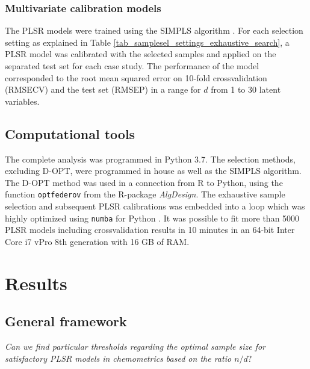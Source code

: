 \documentclass[journal=ancham,manuscript=article]{achemso}
\begin{document}
\subsubsection{Multivariate calibration models}

The PLSR models were trained using the SIMPLS algorithm \cite{DeJong1993}. For each selection setting as explained in Table \ref{tab_samplesel_settings_exhaustive_search}, a PLSR model was calibrated with the selected samples and applied on the separated test set for each case study. The performance of the model corresponded to the root mean squared error on 10-fold crossvalidation (RMSECV) and the test set (RMSEP) in a range for $d$ from 1 to 30 latent variables. 

\subsection{Computational tools}

The complete analysis was programmed in Python 3.7. The selection methods, excluding D-OPT, were programmed in house as well as the SIMPLS algorithm. The D-OPT method was used in a connection from R to Python, using the function \texttt{optfederov} from the R-package \emph{AlgDesign}\cite{Wheeler2019}. The exhaustive sample selection and subsequent PLSR calibrations was embedded into a loop which was highly optimized using \texttt{numba} for Python \cite{Lam2015}. It was possible to fit more than 5000 PLSR models including crossvalidation results in 10 minutes in an 64-bit Inter Core i7 vPro 8th generation with 16 GB of RAM. 



\section*{Results}\label{results}

\subsection*{General framework}\label{results:genframework}

\emph{Can  we  find  particular  thresholds  regarding the optimal sample size for satisfactory PLSR models in chemometrics based on the ratio $n/d?$}
\end{document}
